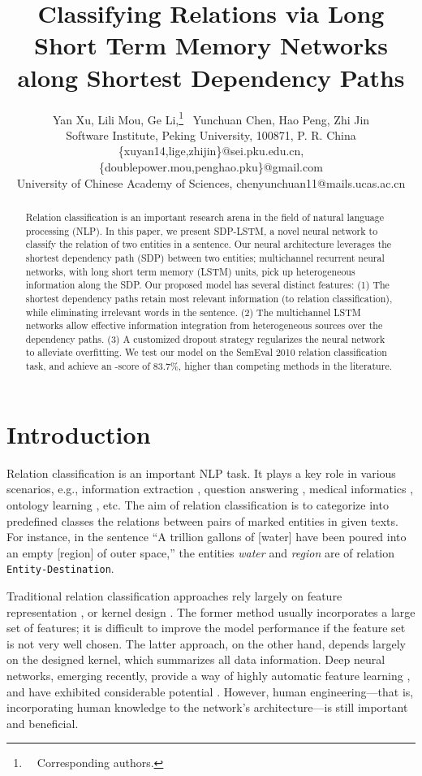 \documentclass[11pt,a4paper]{article}
\title{Classifying Relations via Long Short Term Memory Networks\\
along Shortest Dependency Paths}
\date{}
\author{Yan Xu, Lili Mou, Ge Li,\thanks{\ \ Corresponding authors.}
\ Yunchuan Chen, Hao Peng, Zhi Jin\\
Software Institute, Peking University, 100871, P. R. China\\
\{xuyan14,lige,zhijin\}@sei.pku.edu.cn,\{doublepower.mou,penghao.pku\}@gmail.com\\
University of Chinese Academy of Sciences, chenyunchuan11@mails.ucas.ac.cn
}
\date{}
\begin{document}
\maketitle


\begin{abstract}
Relation classification is an important research arena in
the field of natural language processing (NLP).
In this paper, we present SDP-LSTM, a novel neural network to classify the relation
of two entities in a sentence.
Our neural architecture leverages the shortest dependency path (SDP) between two entities;
multichannel recurrent neural networks, with long short term memory (LSTM) units,
pick up heterogeneous information along the SDP.
Our proposed model has several distinct features: (1)
The shortest dependency paths retain
most relevant information (to relation classification),
while eliminating irrelevant words in the sentence. (2)
The multichannel LSTM networks allow
effective information integration from heterogeneous sources over the dependency paths.
(3) A customized dropout strategy regularizes the neural network to alleviate overfitting.
We test our model on the SemEval 2010 relation classification task,
and achieve an -score of 83.7\%, higher than competing methods in the literature.


\end{abstract}

\section{Introduction}\label{sIntroduction}


Relation classification is an important NLP task.
It plays a key role in various scenarios,
e.g., information extraction \cite{openIE}, question answering \cite{QAFreebase},
medical informatics \cite{MedicalRE}, ontology learning \cite{ontology}, etc.
The aim of relation classification is to categorize into predefined classes the relations between pairs of marked entities in given texts.
For instance, in the sentence ``A trillion gallons of
[water] have been poured into an empty [region] of outer space,'' the entities \textit{water} and
\textit{region} are of relation \verb|Entity-Destination|.

Traditional relation classification approaches rely largely on feature representation
\cite{MaxEntRE}, or kernel design \cite{KerRE,SpdKernel}.
The former method usually incorporates a large set of features;
it is difficult to improve the model performance
if the feature set is not very well chosen.
The latter approach, on the other hand,
depends largely on the designed kernel, which
summarizes all data information.
Deep neural networks, emerging recently,
provide a way of highly automatic feature learning \cite{RL},
and have exhibited considerable potential \cite{CNN,RankCNN}.
However, human engineering---that is, incorporating human knowledge to the network's architecture---is still
important and beneficial.
\end{document}
